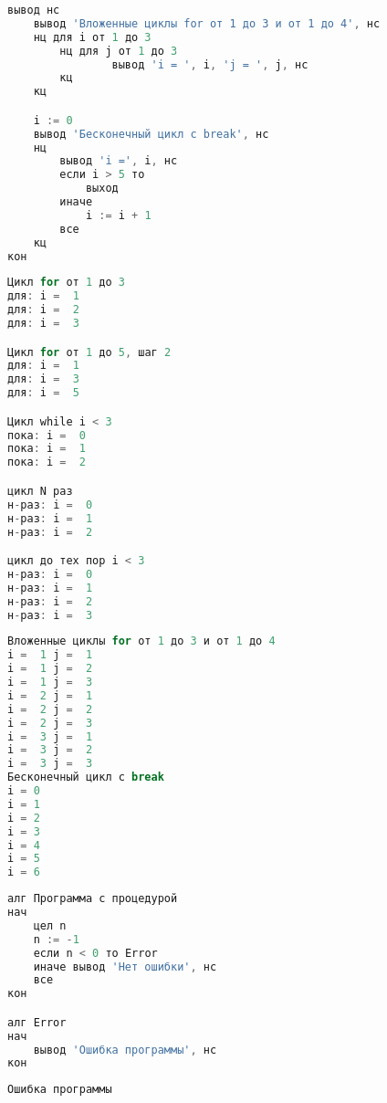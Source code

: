 \newpage
\setcounter{lstlisting}{4}
\begin{lstlisting}[language=go, firstnumber=last, caption={Пример программы с различными видами циклов}]
    вывод нс
    вывод 'Вложенные циклы for от 1 до 3 и от 1 до 4', нс
    нц для i от 1 до 3
        нц для j от 1 до 3
                вывод 'i = ', i, 'j = ', j, нс
        кц
    кц

    i := 0
    вывод 'Бесконечный цикл с break', нс
    нц
        вывод 'i =', i, нс
        если i > 5 то
            выход
        иначе
            i := i + 1
        все
    кц
кон
\end{lstlisting}

\begin{lstlisting}[language=go, caption={Результат программы с различными видами циклов}]
Цикл for от 1 до 3 
для: i =  1 
для: i =  2 
для: i =  3 

Цикл for от 1 до 5, шаг 2 
для: i =  1 
для: i =  3 
для: i =  5 

Цикл while i < 3 
пока: i =  0 
пока: i =  1 
пока: i =  2 

цикл N раз 
н-раз: i =  0 
н-раз: i =  1 
н-раз: i =  2 

цикл до тех пор i < 3 
н-раз: i =  0 
н-раз: i =  1 
н-раз: i =  2 
н-раз: i =  3 
\end{lstlisting}

\newpage
\setcounter{lstlisting}{5}
\begin{lstlisting}[language=go, firstnumber=last, caption={Результат программы с различными видами циклов}]
Вложенные циклы for от 1 до 3 и от 1 до 4 
i =  1 j =  1 
i =  1 j =  2 
i =  1 j =  3 
i =  2 j =  1 
i =  2 j =  2 
i =  2 j =  3 
i =  3 j =  1 
i =  3 j =  2 
i =  3 j =  3 
Бесконечный цикл с break 
i = 0 
i = 1 
i = 2 
i = 3 
i = 4 
i = 5 
i = 6 
\end{lstlisting}

\begin{lstlisting}[language=go, caption={Пример программы с процедурой}]
алг Программа с процедурой
нач
    цел n
    n := -1
    если n < 0 то Error
    иначе вывод 'Нет ошибки', нс
    все
кон

алг Error
нач
    вывод 'Ошибка программы', нс
кон
\end{lstlisting}

\begin{lstlisting}[language=go, caption={Результат программы с процедурой}]
Ошибка программы
\end{lstlisting}

